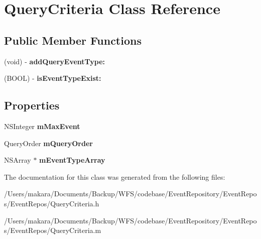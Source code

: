 \hypertarget{interface_query_criteria}{
\section{\-Query\-Criteria \-Class \-Reference}
\label{interface_query_criteria}
}
\subsection*{\-Public \-Member \-Functions}
\begin{DoxyCompactItemize}
\item 
\hypertarget{interface_query_criteria_ab15f003cab64a2698d39ddd663283b91}{
(void) -\/ {\bfseries add\-Query\-Event\-Type\-:}}
\label{interface_query_criteria_ab15f003cab64a2698d39ddd663283b91}

\item 
\hypertarget{interface_query_criteria_a34095d501ae940a3008cd563c7647dc5}{
(\-B\-O\-O\-L) -\/ {\bfseries is\-Event\-Type\-Exist\-:}}
\label{interface_query_criteria_a34095d501ae940a3008cd563c7647dc5}

\end{DoxyCompactItemize}
\subsection*{\-Properties}
\begin{DoxyCompactItemize}
\item 
\hypertarget{interface_query_criteria_a75447889c4839ab11cb25d70a8e01a34}{
\-N\-S\-Integer {\bfseries m\-Max\-Event}}
\label{interface_query_criteria_a75447889c4839ab11cb25d70a8e01a34}

\item 
\hypertarget{interface_query_criteria_af3cb782b7523962dcce37387165a9c4a}{
\-Query\-Order {\bfseries m\-Query\-Order}}
\label{interface_query_criteria_af3cb782b7523962dcce37387165a9c4a}

\item 
\hypertarget{interface_query_criteria_ad10f2fa9c58111a735e7f57cee28afa2}{
\-N\-S\-Array $\ast$ {\bfseries m\-Event\-Type\-Array}}
\label{interface_query_criteria_ad10f2fa9c58111a735e7f57cee28afa2}

\end{DoxyCompactItemize}


\-The documentation for this class was generated from the following files\-:\begin{DoxyCompactItemize}
\item 
/\-Users/makara/\-Documents/\-Backup/\-W\-F\-S/codebase/\-Event\-Repository/\-Event\-Repos/\-Event\-Repos/\-Query\-Criteria.\-h\item 
/\-Users/makara/\-Documents/\-Backup/\-W\-F\-S/codebase/\-Event\-Repository/\-Event\-Repos/\-Event\-Repos/\-Query\-Criteria.\-m\end{DoxyCompactItemize}
